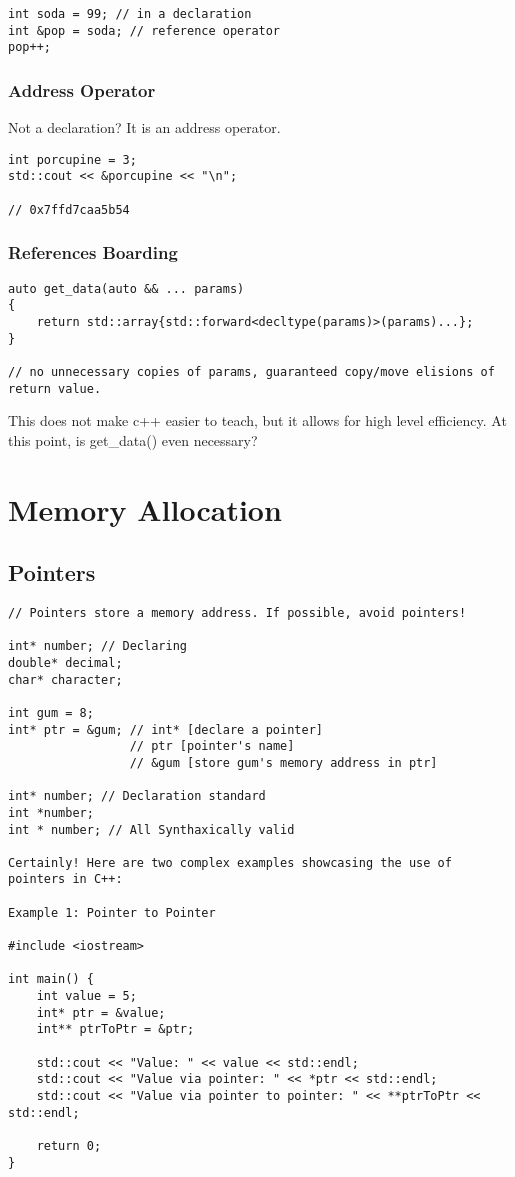 \begin{verbatim}
int soda = 99; // in a declaration
int &pop = soda; // reference operator
pop++;
\end{verbatim}

\subsection{Address Operator}

Not a declaration? It is an address operator.

\begin{verbatim}
int porcupine = 3; 
std::cout << &porcupine << "\n"; 

// 0x7ffd7caa5b54
\end{verbatim}

\subsection{References Boarding}

\begin{verbatim}
auto get_data(auto && ... params)
{
    return std::array{std::forward<decltype(params)>(params)...};
}

// no unnecessary copies of params, guaranteed copy/move elisions of return value.
\end{verbatim}

This does not make c++ easier to teach, but it allows for high level efficiency. At this point, 
is get\_data() even necessary?

\chapter{Memory Allocation}
\section{Pointers}

\begin{verbatim}
// Pointers store a memory address. If possible, avoid pointers!

int* number; // Declaring
double* decimal;
char* character;

int gum = 8;
int* ptr = &gum; // int* [declare a pointer]
                 // ptr [pointer's name]
                 // &gum [store gum's memory address in ptr]

int* number; // Declaration standard
int *number;
int * number; // All Synthaxically valid

Certainly! Here are two complex examples showcasing the use of pointers in C++:

Example 1: Pointer to Pointer

#include <iostream>

int main() {
    int value = 5;
    int* ptr = &value;
    int** ptrToPtr = &ptr;

    std::cout << "Value: " << value << std::endl;
    std::cout << "Value via pointer: " << *ptr << std::endl;
    std::cout << "Value via pointer to pointer: " << **ptrToPtr << std::endl;

    return 0;
}
\end{verbatim}



